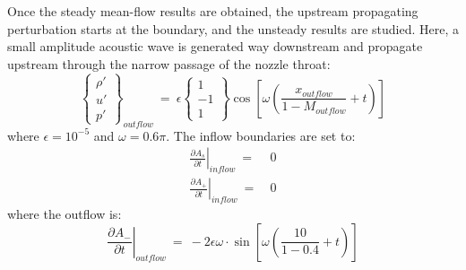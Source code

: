 \documentclass[conf]{new-aiaa}
\begin{document}
Once the steady mean-flow results are obtained, the upstream propagating perturbation starts at the boundary, and the unsteady results are studied.  
Here, a small amplitude acoustic wave is generated way downstream and propagate upstream through the narrow passage of the nozzle throat:
\begin{equation*}
	\left\{
	\begin{matrix}
		{\rho}' \\
		{u}' \\
		{p}'
	\end{matrix}
	\right\}_{outflow}~=~
\epsilon
	\left\{
	\begin{matrix}
		1 \\
		-1 \\
		1
	\end{matrix}
	\right\}\cos\left[\omega\left(\frac{x_{outflow}}{1-M_{outflow}}+t\right)\right]
\end{equation*}
where $\epsilon=10^{-5}$ and $\omega=0.6\pi$. The inflow boundaries are set to:
\begin{equation*}
	\begin{split}
		\label{eq:}
  			\left.\frac{\partial{A_s}}{\partial{t}}\right|_{inflow}~=&~0 \\
  			\left.\frac{\partial{A_+}}{\partial{t}}\right|_{inflow}~=&~0
	\end{split}
\end{equation*}
where the outflow is:
\begin{equation*}
	\left.\frac{\partial{A_-}}{\partial{t}}\right|_{outflow}~=~
		-2\epsilon\omega\cdot{\sin}\left[\omega\left(\frac{10}{1-0.4} +t\right) \right]
\end{equation*}
%
\end{document}
